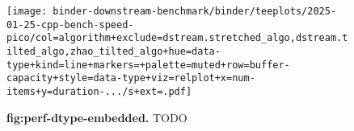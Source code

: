 \begin{figure}

\texttt{[image: binder-downstream-benchmark/binder/teeplots/2025-01-25-cpp-bench-speed-pico/col=algorithm+exclude=dstream.stretched\_algo,dstream.tilted\_algo,zhao\_tilted\_algo+hue=data-type+kind=line+markers=+palette=muted+row=buffer-capacity+style=data-type+viz=relplot+x=num-items+y=duration-.../s+ext=.pdf]}

\caption{
\textbf{fig:perf-dtype-embedded.}
\footnotesize
TODO
}
\label{fig:perf-dtype-embedded}
\end{figure}
